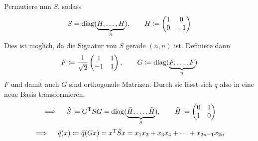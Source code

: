 		Permutiere nun $S$, sodass
		\[ S=\operatorname{diag}( \underbrace{H,\ldots,H}_n ),\qquad H\coloneqq \begin{pmatrix} 1 & 0 \\ 0 & -1 \end{pmatrix} \]
		Dies ist möglich, da die Signatur von $S$ gerade $(n,n)$ ist.
		Definiere dann
		\[
			F\coloneqq \frac{1}{\sqrt{2}}
			\begin{pmatrix}
				1 & 1 \\
				-1 & 1
			\end{pmatrix}
			,\qquad G\coloneqq \operatorname{diag}(\underbrace{F,\ldots,F}_n)
		\]
		$F$ und damit auch $G$ sind orthogonale Matrizen.
		Durch sie lässt sich $q$ also in eine neue Basis transformieren.
		\[ \implies \quad \hat{S} \coloneqq {G}^{\mathrm{T}}SG = \operatorname{diag}(\underbrace{\tilde{H},\ldots,\tilde{H}}_n),\qquad \tilde{H} \coloneqq \begin{pmatrix} 0 & 1 \\ 1 & 0 \end{pmatrix} \]
		\[ \implies \quad \hat{q}(x)\coloneqq \tilde{q}(Gx) = {x}^{\mathrm{T}}\hat{S}x = x_1x_2 + x_3x_4 + \cdots + x_{2n-1}x_{2n} \]
		\qedbox



